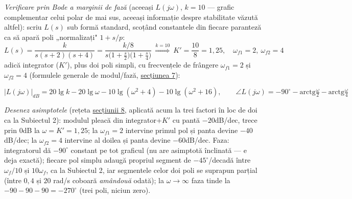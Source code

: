 \documentclass[10pt,a4paper]{article}
\begin{document}
\begin{center}
\end{center}

\textit{Verificare prin Bode a marginii de fază} (aceeași $L(j\omega)$, $k{=}10$ — grafic complementar celui polar de mai sus, aceeași informație despre stabilitate văzută altfel): scriu $L(s)$ sub formă standard, scoțând constantele din fiecare paranteză ca să apară poli „normalizați" $1{+}s/p$:
$$L(s)=\dfrac{k}{s(s+2)(s+4)}=\dfrac{k/8}{s\big(1{+}\tfrac s2\big)\big(1{+}\tfrac s4\big)}\ \overset{k=10}{\Longrightarrow}\ K'{=}\dfrac{10}8{=}1{,}25,\quad \omega_{f1}{=}2,\ \omega_{f2}{=}4$$
adică integrator ($K'$), plus doi poli simpli, cu frecvențele de frângere $\omega_{f1}{=}2$ și $\omega_{f2}{=}4$ (formulele generale de modul/fază, \hyperref[sec:7]{secțiunea 7}):
\begin{keyeq}\color{red!65!black}
$$|L(j\omega)|_{dB}=20\lg k-20\lg\omega-10\lg(\omega^2{+}4)-10\lg(\omega^2{+}16),\qquad \angle L(j\omega)={-}90^\circ-\mathrm{arctg}\tfrac\omega2-\mathrm{arctg}\tfrac\omega4$$
\end{keyeq}

\textit{Desenez asimptotele} (rețeta \hyperref[sec:8]{secțiunii 8}, aplicată acum la trei factori în loc de doi ca la Subiectul 2): modulul pleacă din integrator+$K'$ cu pantă $-20$dB/dec, trece prin $0$dB la $\omega{=}K'{=}1{,}25$; la $\omega_{f1}{=}2$ intervine primul pol și panta devine $-40$dB/dec; la $\omega_{f2}{=}4$ intervine al doilea și panta devine $-60$dB/dec. Faza: integratorul dă $-90^\circ$ constant pe tot graficul (nu are asimptotă înclinată — e deja exactă); fiecare pol simplu adaugă propriul segment de $-45^\circ$/decadă între $\omega_f/10$ și $10\omega_f$, ca la Subiectul 2, iar segmentele celor doi poli se suprapun parțial (între $0{,}4$ și $20$ rad/s coboară \emph{amândouă} odată); la $\omega\to\infty$ faza tinde la $-90{-}90{-}90{=}{-}270^\circ$ (trei poli, niciun zero).
\end{document}
